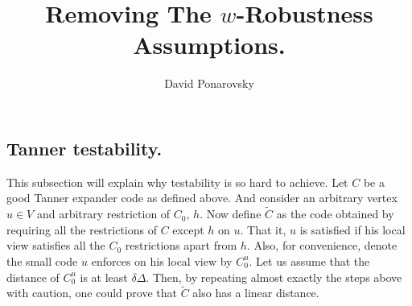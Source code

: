 \documentclass[manuscript,screen,review]{acmart}
\begin{document}
\newcommand{\commentt}[1]{\textcolor{blue}{ \textbf{[COMMENT]} #1}}
\newcommand{\ctt}[1]{\commentt{#1}}
\newcommand{\prb}[1]{ \mathbf{Pr} \left[ {#1} \right]}
\newcommand{\onotation}[1]{\(\mathcal{O} \left( {#1}  \right) \)}
\newcommand{\ona}[1]{\onotation{#1}}
\newcommand{\Cpa}{[n, \rho n, \delta n]}
\newcommand{\Jvv}{ \bar{J_{v}} } 
\newcommand{\Cvv}{ \tilde{C_{v}} } 

\newcommand{\Gz}{ G_{z}^{\delta} } 
\newcommand{ \Tann } {  \mathcal{T}\left( G, C_0 \right) }
\newcommand{\ireducable}{ireducable \hyperref[ire]{[\ref{ire}]} }
\newcommand{\cutUU}{E(U_{-1} \bigcup U_{+1} ,U)} 
\newcommand{\wcutUU}{w\left( E(U_{-1} \bigcup U_{+1} ,U)  \right)}
\newcommand{\testgo}{  \mathcal{T}\left(J, q , C_{0}\right) } 

\newcommand{\duC}{\left( C_{A}^{\perp}\otimes C_{B}^{\perp} \right)^{\perp}}
\newcommand{\duduC}{\left( C_{A}\otimes C_{B}\right)^{\perp}}
\title{Removing The $w$-Robustness Assumptions.} 
\author{David Ponarovsky}

\ifdefined\ACM
{}
\else
\maketitle
\fi

\ifdefined\ACM
\maketitle
\fi

    

 \subsection{Tanner testability.} This subsection will explain why testability is so hard to achieve. Let $C$ be a good Tanner expander code as defined above. And consider an arbitrary vertex $u \in V$ and arbitrary restriction of $C_{0}$, $h$. Now define $\tilde{C}$ as the code obtained by requiring all the restrictions of $C$ except $h$ on $u$. That it, $u$ is satisfied if his local view satisfies all the $C_{0}$ restrictions apart from $h$.
  Also, for convenience, denote the small code $u$ enforces on his local view by $C_{0}^{u}$. Let us assume that the distance of $C_{0}^{u}$ is at least $\delta\Delta$. 
  Then, by repeating almost exactly the steps above with caution, one could prove that $\tilde{C}$ also has a linear distance. 
\end{document}
